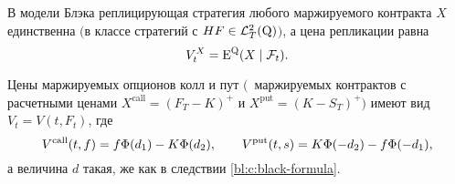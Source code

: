 \begin{proposition}
В модели Блэка реплицирующая стратегия любого маржируемого контракта $X$ единственна $($в классе стратегий с $HF\in \mathcal{L}^2_T(\mathrm{Q})$$)$, а цена репликации равна
\[
V_t^X = \operatorname{E}^{\mathrm{Q}} (X \mid \mathcal{F}_t).
\]
\end{proposition}

\begin{corollary}
Цены маржируемых опционов колл и пут $($\te\ маржируемых контрактов с расчетными ценами $X^\text{call} = (F_T - K)^+$ и $X^\text{put} = (K-S_T)^+$$)$ имеют вид $V_t = V(t,F_t)$, где
\[
V^{\text{\normalfont call}}(t,f) = f\Phi(d_1) - K\Phi(d_2), \qquad
V^{\text{\normalfont put}}(t,s) = K\Phi(-d_2) - f\Phi(-d_1),
\]
а величина $d$ такая, же как в следствии \ref{bl:c:black-formula}.
\end{corollary}
